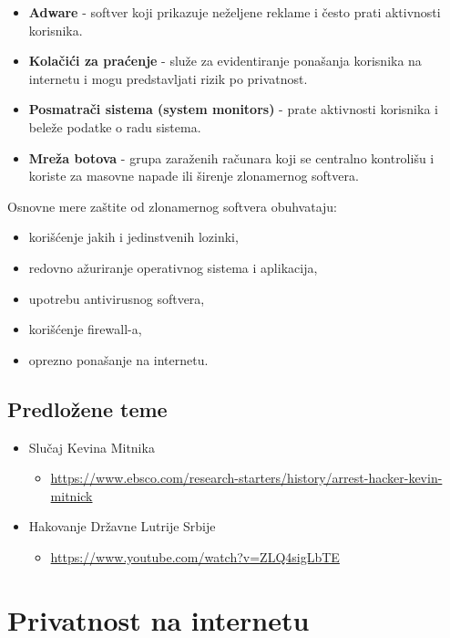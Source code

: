 \documentclass[a4paper, 12pt]{article}
\begin{document}
\begin{itemize}
    \item \textbf{Adware} - softver koji prikazuje neželjene reklame i često prati
    aktivnosti korisnika.

    \item \textbf{Kolačići za praćenje} - služe za evidentiranje ponašanja korisnika na
    internetu i mogu predstavljati rizik po privatnost.

    \item \textbf{Posmatrači sistema (system monitors)} - prate aktivnosti korisnika i
    beleže podatke o radu sistema.

    \item \textbf{Mreža botova} - grupa zaraženih računara koji se centralno
    kontrolišu i koriste za masovne napade ili širenje zlonamernog softvera.
\end{itemize}
Osnovne mere zaštite od zlonamernog softvera obuhvataju:
\begin{itemize}
    \item korišćenje jakih i jedinstvenih lozinki,
    \item redovno ažuriranje operativnog sistema i aplikacija,
    \item upotrebu antivirusnog softvera,
    \item korišćenje firewall-a,
    \item oprezno ponašanje na internetu.
\end{itemize}

\subsection{Predložene teme}

\begin{itemize}
    \item Slučaj Kevina Mitnika
    \begin{itemize}
        \item \url{https://www.ebsco.com/research-starters/history/arrest-hacker-kevin-mitnick}
    \end{itemize}
    \item Hakovanje Državne Lutrije Srbije
    \begin{itemize}
        \item \url{https://www.youtube.com/watch?v=ZLQ4sigLbTE}
    \end{itemize}
    
\end{itemize}


\section{Privatnost na internetu}
\end{document}
